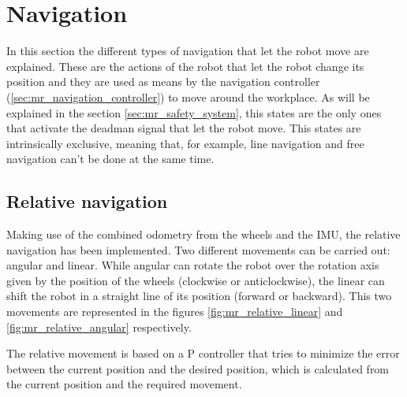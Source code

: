 \section{Navigation} %
\label{sec:mr_navigation}
In this section the different types of navigation that let the robot move are explained.
These are the actions of the robot that let the robot change its position and they are used as means by the navigation controller (\ref{sec:mr_navigation_controller}) to move around the workplace.
As will be explained in the section \ref{sec:mr_safety_system}, this states are the only ones that activate the deadman signal that let the robot move.
This states are intrinsically exclusive, meaning that, for example, line navigation and free navigation can't be done at the same time.

    \subsection{Relative navigation} %
    \label{sub:mr_relative_navigation}
    Making use of the combined odometry from the wheels and the IMU, the relative navigation has been implemented.
    Two different movements can be carried out: angular and linear.
    While angular can rotate the robot over the rotation axis given by the position of the wheels (clockwise or anticlockwise), the linear can shift the robot in a straight line of its position (forward or backward).
    This two movements are represented in the figures \ref{fig:mr_relative_linear} and \ref{fig:mr_relative_angular} respectively.

    The relative movement is based on a P controller that tries to minimize the error between the current position and the desired position, which is calculated from the current position and the required movement.

